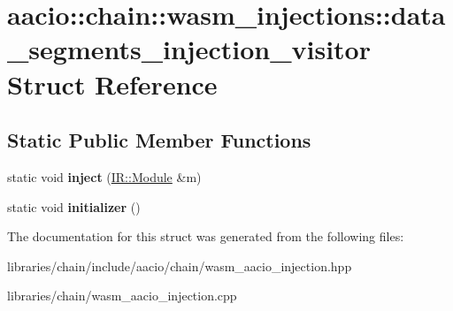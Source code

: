 \hypertarget{structaacio_1_1chain_1_1wasm__injections_1_1data__segments__injection__visitor}{}\section{aacio\+:\+:chain\+:\+:wasm\+\_\+injections\+:\+:data\+\_\+segments\+\_\+injection\+\_\+visitor Struct Reference}
\label{structaacio_1_1chain_1_1wasm__injections_1_1data__segments__injection__visitor}
\subsection*{Static Public Member Functions}
\begin{DoxyCompactItemize}
\item 
\mbox{\label{structaacio_1_1chain_1_1wasm__injections_1_1data__segments__injection__visitor_ab73e129b0917306ca5523639ffff7e4f}} 
static void {\bfseries inject} (\mbox{\hyperlink{struct_i_r_1_1_module}{I\+R\+::\+Module}} \&m)
\item 
\mbox{\label{structaacio_1_1chain_1_1wasm__injections_1_1data__segments__injection__visitor_a8dd217b52fdf64bd23f94f08698ebabe}} 
static void {\bfseries initializer} ()
\end{DoxyCompactItemize}


The documentation for this struct was generated from the following files\+:\begin{DoxyCompactItemize}
\item 
libraries/chain/include/aacio/chain/wasm\+\_\+aacio\+\_\+injection.\+hpp\item 
libraries/chain/wasm\+\_\+aacio\+\_\+injection.\+cpp\end{DoxyCompactItemize}

